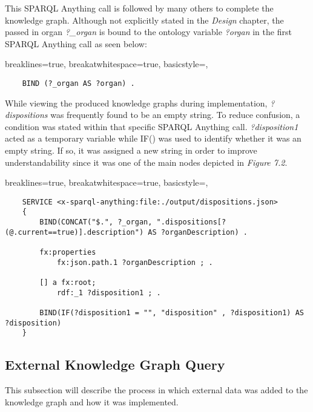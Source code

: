 This SPARQL Anything call is followed by many others to complete the knowledge graph. Although not explicitly stated in the \textit{Design} chapter, the passed in organ \textit{?\_organ} is bound to the ontology variable \textit{?organ} in the first SPARQL Anything call as seen below:

\lstset
{
    breaklines=true,
    breakatwhitespace=true,
    basicstyle=\linespread{1.5}\ttfamily,
}
\begin{lstlisting}
    BIND (?_organ AS ?organ) .
\end{lstlisting}

While viewing the produced knowledge graphs during implementation, \textit{?dispositions} was frequently found to be an empty string. To reduce confusion, a condition was stated within that specific SPARQL Anything call. \textit{?disposition1} acted as a temporary variable while IF() was used to identify whether it was an empty string. If so, it was assigned a new string in order to improve understandability since it was one of the main nodes depicted in \textit{Figure 7.2}. 

\lstset
{
    breaklines=true,
    breakatwhitespace=true,
    basicstyle=\linespread{1.5}\ttfamily,
}
\begin{lstlisting}
    SERVICE <x-sparql-anything:file:./output/dispositions.json>
    {
        BIND(CONCAT("$.", ?_organ, ".dispositions[?(@.current==true)].description") AS ?organDescription) .
    
        fx:properties
            fx:json.path.1 ?organDescription ; .
    
        [] a fx:root; 
            rdf:_1 ?disposition1 ; .
    
        BIND(IF(?disposition1 = "", "disposition" , ?disposition1) AS ?disposition)
    } 
\end{lstlisting}

\subsection{External Knowledge Graph Query}
\hspace*{0.5cm} This subsection will describe the process in which external data was added to the knowledge graph and how it was implemented. 

